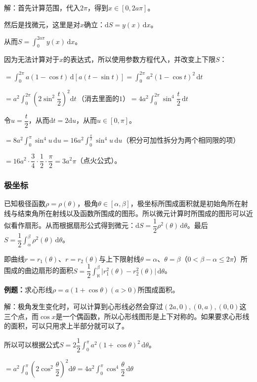 \documentclass[UTF8, 12pt]{ctexart}
\begin{document}
解：首先计算范围，代入$2\pi$，得到$x\in[0,2a\pi]$。

然后是找微元，这里是对$x$确立：$\textrm{d}S=y(x)\,\textrm{d}x$。

从而$S=\int_0^{2a\pi}y(x)\,\textrm{d}x$。

因为无法计算对于$x$的表达式，所以使用参数方程代入，并改变上下限$S$：

$=\int_0^{2\pi}a(1-\cos t)\,\textrm{d}[a(t-\sin t)]=\int_0^{2\pi}a^2(1-\cos t)^2\,\textrm{d}t$

$=a^2\displaystyle{\int_0^{2\pi}\left(2\sin^2\dfrac{t}{2}\right)^2\textrm{d}t}\,\text{（消去里面的1）}=4a^2\displaystyle{\int_0^{2\pi}\sin^4\dfrac{t}{2}\,\textrm{d}t}$

令$u=\dfrac{t}{2}$，从而$\textrm{d}t=2\textrm{d}u$，从而$u\in[0,\pi]$。

$=8a^2\int_0^\pi\sin^4u\,\textrm{d}u=16a^2\int_0^{\frac{\pi}{2}}\sin^4u\,\textrm{d}u$（积分可加性拆分为两个相同限的项）

$=16a^2\cdot\dfrac{3}{4}\cdot\dfrac{1}{2}\cdot\dfrac{\pi}{2}=3a^2\pi$（点火公式）。

\subsubsection{极坐标}

已知极径函数$\rho=\rho(\theta)$，极角$\theta\in[\alpha,\beta]$，极坐标所围成面积就是初始角所在射线与结束角所在射线以及函数所围成的图形。所以微元计算时所围成的图形可以近似看作扇形。从而根据扇形公式得到微元：$\textrm{d}S=\dfrac{1}{2}\rho^2(\theta)\,\textrm{d}\theta$。最后$S=\dfrac{1}{2}\int_\alpha^\beta\rho^2(\theta)\,\textrm{d}\theta$。

即曲线$r=r_1(\theta)$、$r=r_2(\theta)$与上下限射线$\theta=\alpha$、$\theta=\beta$（$0<\beta-\alpha\leqslant2\pi$）所围成的曲边扇形的面积$S=\dfrac{1}{2}\int_\aleph^\beta\vert r_1^2(\theta)-r_2^2(\theta)\vert\,\textrm{d}\theta$。

\textbf{例题：}求心形线$\rho=a(1+\cos\theta)(a>0)$所围成面积。

解：极角发生变化时，可以计算到心形线必然会穿过$(2a,0),(0,a),(0,0)$这三个点，而$\cos x$是一个偶函数，所以心形线图形是上下对称的。如果要求心形线的面积，可以只用求上半部分就可以了。

所以可以根据公式$S=2\dfrac{1}{2}\int_0^\pi a^2(1+\cos\theta)^2\,\textrm{d}\theta$。

$=a^2\displaystyle{\int_0^\pi\left(2\cos^2\dfrac{\theta}{2}\right)^2\textrm{d}\theta}=4a^2\displaystyle{\int_0^\pi\cos^4\dfrac{\theta}{2}\,\textrm{d}\theta}$
\end{document}
